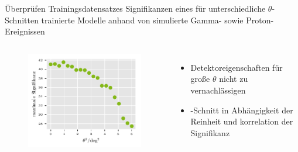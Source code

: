 \documentclass[aspectratio=1610, professionalfonts, 9pt]{beamer}
\begin{document}
\begin{frame}{Überprüfen Trainingsdatensatzes}
  Signifikanzen eines für unterschiedliche $\theta$-Schnitten trainierte Modelle anhand von simulierte Gamma- sowie Proton-Ereignissen
  \begin{columns}[onlytextwidth]
	\begin{figure}
	  \centering
	  \includegraphics[width=\textwidth]{./Plots/corr_sig_theta2.pdf}
	\end{figure}
	\begin{itemize}
	  \item Detektoreigenschaften für große $\theta$ nicht zu vernachlässigen
	  \item \theta-Schnitt in Abhängigkeit der Reinheit und korrelation der Signifikanz
	\end{itemize}
  \end{columns}
\end{frame}
\end{document}
